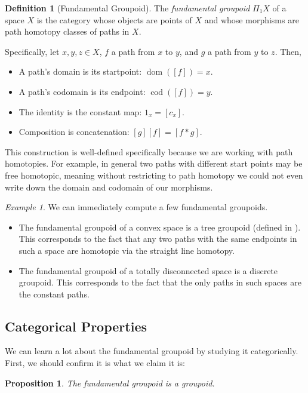 \documentclass[11 pt]{amsart}
\theoremstyle{plain}   %
\newtheorem{prop}{Proposition}[section]
\theoremstyle{definition}
\newtheorem{defn}{Definition}[section]
\theoremstyle{remark}
\newtheorem{ex}{Example}[section]
\numberwithin{equation}{section}
\DeclareMathOperator{\dom}{dom}
\DeclareMathOperator{\cod}{cod}
\begin{document}
\begin{defn}[Fundamental Groupoid]
	The \textit{fundamental groupoid} $\Pi_1X$ of a space $X$ is the category
	whose objects are points of $X$ and whose morphisms are path homotopy classes
	of paths in $X$.
\end{defn}

Specifically, let $x,y,z\in X$, $f$ a path from $x$ to $y$, and $g$ a path from
$y$ to $z$. Then,

\begin{itemize}
	\item A path's domain is its startpoint: $\dom([f]) = x$.
	\item A path's codomain is its endpoint: $\cod([f]) = y$.
	\item The identity is the constant map: $1_x = [c_x]$.
	\item Composition is concatenation: $[g][f] = [f*g]$.
\end{itemize}

This construction is well-defined specifically because we are working with path
homotopies. For example, in general two paths with different start points may be
free homotopic, meaning without restricting to path homotopy we could not even
write down the domain and codomain of our morphisms.

\begin{ex}\cite[p. 213]{Brown}
	We can immediately compute a few fundamental groupoids.
	\begin{itemize}
		\item The fundamental groupoid of a convex space is a tree groupoid (defined
		      in ). This corresponds to the fact that any two paths with
		      the same endpoints in such a space are homotopic via the straight line
		      homotopy.
		\item The fundamental groupoid of a totally disconnected space is a discrete
		      groupoid. This corresponds to the fact that the only paths in such spaces
		      are the constant paths.
	\end{itemize}
\end{ex}

\subsection{Categorical Properties} We can learn a lot about the fundamental
groupoid by studying it categorically. First, we should confirm it is what we
claim it is:

\begin{prop}\label{fundamental groupoid is a groupoid}
	The fundamental groupoid is a groupoid.
\end{prop}
\end{document}
